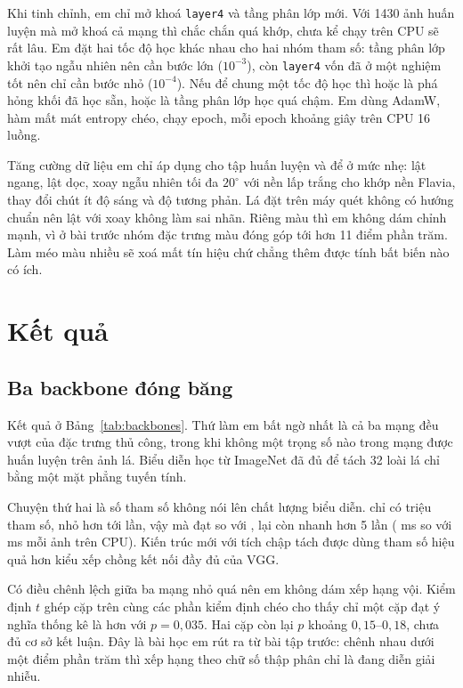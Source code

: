 \documentclass[11pt,a4paper]{article}
\begin{document}
Khi tinh chỉnh, em chỉ mở khoá \texttt{layer4} và tầng phân lớp mới. Với 1430 ảnh huấn luyện mà mở
khoá cả mạng thì chắc chắn quá khớp, chưa kể chạy trên CPU sẽ rất lâu. Em đặt hai tốc độ học khác
nhau cho hai nhóm tham số: tầng phân lớp khởi tạo ngẫu nhiên nên cần bước lớn ($10^{-3}$), còn
\texttt{layer4} vốn đã ở một nghiệm tốt nên chỉ cần bước nhỏ ($10^{-4}$). Nếu để chung một tốc độ
học thì hoặc là phá hỏng khối đã học sẵn, hoặc là tầng phân lớp học quá chậm. Em dùng AdamW, hàm mất
mát entropy chéo, chạy \epochs{} epoch, mỗi epoch khoảng \epochseconds{} giây trên CPU 16 luồng.

Tăng cường dữ liệu em chỉ áp dụng cho tập huấn luyện và để ở mức nhẹ: lật ngang, lật dọc, xoay ngẫu
nhiên tối đa $20^\circ$ với nền lấp trắng cho khớp nền Flavia, thay đổi chút ít độ sáng và độ tương
phản. Lá đặt trên máy quét không có hướng chuẩn nên lật với xoay không làm sai nhãn. Riêng màu thì
em không dám chỉnh mạnh, vì ở bài trước nhóm đặc trưng màu đóng góp tới hơn 11 điểm phần trăm. Làm
méo màu nhiều sẽ xoá mất tín hiệu chứ chẳng thêm được tính bất biến nào có ích.

\section{Kết quả}

\subsection{Ba backbone đóng băng}

Kết quả ở Bảng~\ref{tab:backbones}. Thứ làm em bất ngờ nhất là cả ba mạng đều vượt \classicalcv{}
của đặc trưng thủ công, trong khi không một trọng số nào trong mạng được huấn luyện trên ảnh lá.
Biểu diễn học từ ImageNet đã đủ để tách 32 loài lá chỉ bằng một mặt phẳng tuyến tính.



Chuyện thứ hai là số tham số không nói lên chất lượng biểu diễn. \lightname{} chỉ có
\lightparams{} triệu tham số, nhỏ hơn \heavyname{} tới \paramratio{} lần, vậy mà đạt \lightcv{} so
với \heavycv{}, lại còn nhanh hơn 5 lần (\lightms{} ms so với \heavyms{} ms mỗi ảnh trên CPU). Kiến
trúc mới với tích chập tách được dùng tham số hiệu quả hơn kiểu xếp chồng kết nối đầy đủ của VGG.

Có điều chênh lệch giữa ba mạng nhỏ quá nên em không dám xếp hạng vội. Kiểm định $t$ ghép cặp trên
cùng các phần kiểm định chéo cho thấy chỉ một cặp đạt ý nghĩa thống kê là \probebestname{} hơn
\probeworstname{} với $p = 0{,}035$. Hai cặp còn lại $p$ khoảng $0{,}15$--$0{,}18$, chưa đủ cơ sở
kết luận. Đây là bài học em rút ra từ bài tập trước: chênh nhau dưới một điểm phần trăm thì xếp hạng
theo chữ số thập phân chỉ là đang diễn giải nhiễu.
\end{document}
